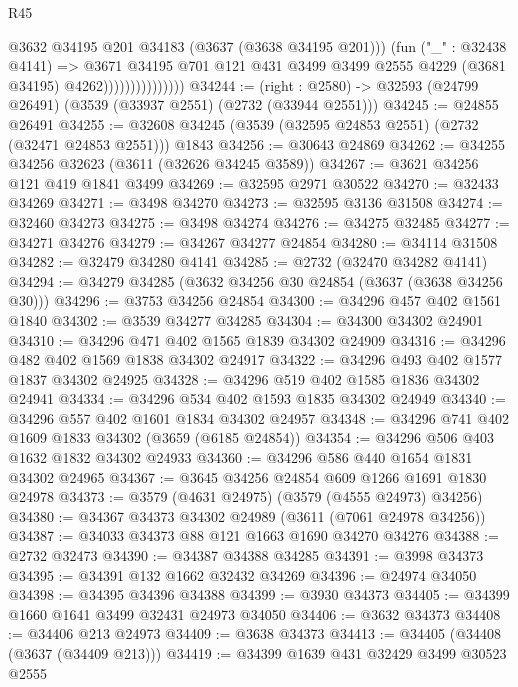 \begin{lexlean}{R45}
\begin{coremodule}
                                @3632 @34195 @201 @34183 (@3637 (@3638 @34195 @201)))
                                (fun ("_" : @32438 @4141) =>
                                @3671
                                  @34195
                                  @701
                                  @121
                                  @431
                                  @3499
                                  @3499
                                  @2555
                                  @4229
                                  (@3681 @34195)
                                  @4262)))))))))))))))
@34244 := (right : @2580) -> @32593 (@24799 @26491) (@3539 (@33937 @2551) (@2732 (@33944 @2551)))
@34245 := @24855 @26491
@34255 := @32608 @34245 (@3539 (@32595 @24853 @2551) (@2732 (@32471 @24853 @2551))) @1843
@34256 := @30643 @24869
@34262 := @34255 @34256 @32623 (@3611 (@32626 @34245 @3589))
@34267 := @3621 @34256 @121 @419 @1841 @3499
@34269 := @32595 @2971 @30522
@34270 := @32433 @34269
@34271 := @3498 @34270
@34273 := @32595 @3136 @31508
@34274 := @32460 @34273
@34275 := @3498 @34274
@34276 := @34275 @32485
@34277 := @34271 @34276
@34279 := @34267 @34277 @24854
@34280 := @34114 @31508
@34282 := @32479 @34280 @4141
@34285 := @2732 (@32470 @34282 @4141)
@34294 := @34279 @34285 (@3632 @34256 @30 @24854 (@3637 (@3638 @34256 @30)))
@34296 := @3753 @34256 @24854
@34300 := @34296 @457 @402 @1561 @1840
@34302 := @3539 @34277 @34285
@34304 := @34300 @34302 @24901
@34310 := @34296 @471 @402 @1565 @1839 @34302 @24909
@34316 := @34296 @482 @402 @1569 @1838 @34302 @24917
@34322 := @34296 @493 @402 @1577 @1837 @34302 @24925
@34328 := @34296 @519 @402 @1585 @1836 @34302 @24941
@34334 := @34296 @534 @402 @1593 @1835 @34302 @24949
@34340 := @34296 @557 @402 @1601 @1834 @34302 @24957
@34348 := @34296 @741 @402 @1609 @1833 @34302 (@3659 (@6185 @24854))
@34354 := @34296 @506 @403 @1632 @1832 @34302 @24933
@34360 := @34296 @586 @440 @1654 @1831 @34302 @24965
@34367 := @3645 @34256 @24854 @609 @1266 @1691 @1830 @24978
@34373 := @3579 (@4631 @24975) (@3579 (@4555 @24973) @34256)
@34380 := @34367 @34373 @34302 @24989 (@3611 (@7061 @24978 @34256))
@34387 := @34033 @34373 @88 @121 @1663 @1690 @34270 @34276
@34388 := @2732 @32473
@34390 := @34387 @34388 @34285
@34391 := @3998 @34373
@34395 := @34391 @132 @1662 @32432 @34269
@34396 := @24974 @34050
@34398 := @34395 @34396 @34388
@34399 := @3930 @34373
@34405 := @34399 @1660 @1641 @3499 @32431 @24973 @34050
@34406 := @3632 @34373
@34408 := @34406 @213 @24973
@34409 := @3638 @34373
@34413 := @34405 (@34408 (@3637 (@34409 @213)))
@34419 := @34399 @1639 @431 @32429 @3499 @30523 @2555

\end{coremodule}
\end{lexlean}
